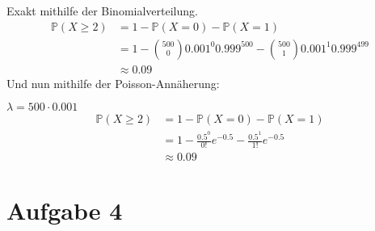 \documentclass[10pt,a4paper,parskip=half]{scrartcl}
\begin{document}
Exakt mithilfe der Binomialverteilung.
\begin{align*}
\mathbb P(X \ge 2) &= 1 - \mathbb P(X = 0) - \mathbb P(X = 1)\\
&= 1 - {500 \choose 0 } 0.001^0 0.999^500 - {500 \choose 1 } 0.001^1 0.999^499\\
&\approx 0.09
\end{align*}
Und nun mithilfe der Poisson-Annäherung:

$\lambda = 500 \cdot 0.001$
\begin{align*}
\mathbb P(X \ge 2) &= 1 - \mathbb P(X = 0) - \mathbb P(X = 1)\\
&= 1 - \frac{0.5^0}{0!}e^{-0.5} - \frac{0.5^1}{1!}e^{-0.5}\\
& \approx 0.09
\end{align*}
\section*{Aufgabe 4}
\end{document}
